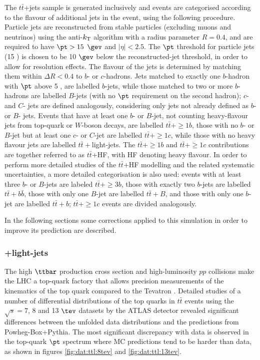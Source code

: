 The $t\bar{t}$+jets sample is generated inclusively and events are categorised according to the flavour of additional jets in the event, using the following procedure. Particle jets are reconstructed from stable particles (excluding muons and neutrinos) using the anti-$k_{\rm T}$ algorithm with a radius parameter $R = 0.4$, and are required to have $\pt > 15$ $\gev$ and $|\eta| < 2.5$. The $\pt$ threshold for particle jets (15 \gev) is chosen to be 10 $\gev$ below the reconstructed-jet threshold, in order to allow for resolution effects. The flavour of the jets is determined by matching them within $\Delta R < 0.4$ to $b$- or $c$-hadrons. Jets matched to exactly one $b$-hadron with $\pt$ above 5 \gev, are labelled $b$-jets, while those matched to two or more $b$-hadrons are labelled $B$-jets (with no $\pt$ requirement on the second hadron); $c$- and $C$- jets are defined analogously, considering only jets not already defined as $b$- or $B$- jets. Events that have at least one $b$- or $B$-jet, not counting heavy-flavour jets from top-quark or $W$-boson decays, are labelled $t\bar{t}+\ge1b$, those with no $b$- or $B$-jet but at least one $c$- or $C$-jet are labelled $t\bar{t}+\ge1c$, while those with no heavy flavour jets are labelled $t\bar{t}+$light-jets. The $t\bar{t}+\ge1b$ and $t\bar{t}+\ge1c$ contributions are together referred to as $t\bar{t}$+HF, with HF denoting heavy flavour. 
In order to perform more detailed studies of the  $t\bar{t}$+HF modelling and the related systematic uncertainties, a more detailed categorisation is also used: events with at least three $b$- or $B$-jets are labeled $t\bar{t}+\ge3b$, those with exactly two $b$-jets are labelled $t\bar{t}+b\bar{b}$, those with only one $B$-jet are labelled $t\bar{t}+B$, and those with only one $b$-jet are labelled $t\bar{t}+b$; $t\bar{t}+\ge1c$ events are divided analogously. 

In the following sections some corrections applied to this simulation in order to improve its prediction are described.

\subsubsection[$t\bar{t}$+light-jets]{+light-jets}
The high $\ttbar$ production cross section and high-luminosity $pp$ collisions make the LHC a top-quark factory that allows precision measurements of the kinematics of the top quark compared to the Tevatron \cite{Cacciari:2011hy}. Detailed studies of a number of differential distributions of the top quarks in $t\bar{t}$ events using the $\sqrt{s}=7$, 8 and 13 $\tev$ datasets by the ATLAS detector \cite{Aaboud:2016iot,Aad:2014zka,Aad:2015mbv,Aaboud:2016syx,ATLAS-CONF-2016-040} revealed significant differences between the unfolded data distributions and the predictions from {\sc Powheg-Box+Pythia}. The most significant discrepancy with data is observed in the top-quark $\pt$ spectrum  where MC predictions tend to be harder than data, as shown in figures \ref {fig:dat:ttl:8tev} and \ref{fig:dat:ttl:13tev}.

